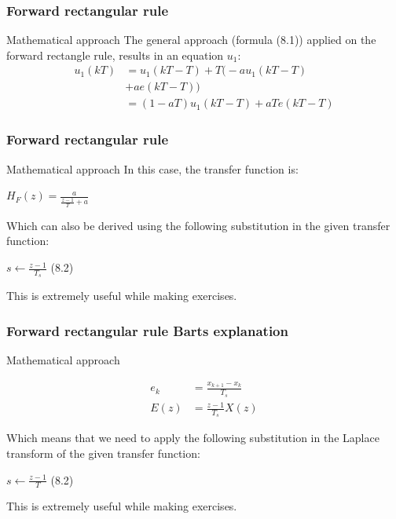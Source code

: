 \begin{frame}
	\frametitle{Forward rectangular rule}
	\begin{block}{Mathematical approach}
		The general approach (formula (8.1)) applied on the forward rectangle rule, results in an equation $u_1$:
		\begin{align*}
		u_1(kT)& =u_1(kT - T) + T\big(-au_1(kT - T)\\
		& + ae(kT - T) \big)\\
		& =(1 - aT)u_1(kT - T) + aTe(kT - T)
		\end{align*}
	\end{block}
\end{frame}

\begin{frame}
	\frametitle{Forward rectangular rule}
	\begin{block}{Mathematical approach}
		In this case, the transfer function is:
		\begin{center}
		$H_F(z) = \frac{a}{\frac{z-1}{T}+a}$
		\end{center}
		Which can also be derived using the following substitution in the given transfer function:
		\begin{center}
			$s \gets \frac{z-1}{T_s}$ (8.2)
		\end{center}
		This is extremely useful while making exercises.
	\end{block}
\end{frame}	

\begin{frame}
	\frametitle{Forward rectangular rule Barts explanation}
	\begin{block}{Mathematical approach}
		\begin{center}
			\begin{align*}
			e_k &= \frac{x_{k+1} - x_{k}}{T_s}\\
			E(z) &= \frac{z -1}{T_s} X(z)
			\end{align*}
		\end{center}
		Which means that we need to apply the following substitution in the Laplace transform of the given transfer function:
		\begin{center}
			$s \gets \frac{z-1}{T}$ (8.2)
		\end{center}
		This is extremely useful while making exercises.
	\end{block}
\end{frame}

